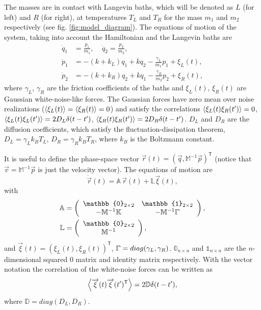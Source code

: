 The  masses are in contact with Langevin baths, which will be denoted as $L$ (for left) and $R$ (for right), at temperatures $T_{L}$ and $T_R$ for  the mass $m_1$ and $m_2$ respectively (see fig. \ref{fig:model_diagram}). The equations of motion of the system, taking into account the Hamiltonian and the Langevin baths are
%
\begin{align}
  \dot{q}_1 &= \frac{p_1}{m_1},\;\;\;\;
  \dot{q}_2 = \frac{p_2}{m_2},\nonumber
  \\
  \dot{p}_1 &= -(k+k_L)q_1 + k q_2 -\frac{\gamma_L}{m_1} p_1 + \xi_L(t),\nonumber
  \\
  \dot{p}_2 &= -(k+k_R)q_2 + k q_1 -\frac{\gamma_R}{m_2} p_2 + \xi_R(t),
\end{align}
%
where $\gamma_L$, $\gamma_R$ are the friction coefficients of the baths and $\xi_L(t)$, $\xi_R(t)$ are Gaussian white-noise-like forces. The Gaussian forces have zero mean over noise realizations ($\expval{ \xi_L(t) } = \expval{ \xi_R(t) } = 0 $) and satisfy the correlations $\expval{ \xi_L(t)\xi_R(t') } = 0$, $\expval{ \xi_L(t)\xi_L(t') } = 2D_L\delta(t-t')$, $\expval{ \xi_R(t)\xi_R(t') } = 2D_R\delta(t-t')$. $D_L$ and $D_R$ are the diffusion coefficients, which satisfy the fluctuation-dissipation theorem, $D_L = \gamma_L k_B T_L$, $D_R =\gamma_R k_B T_R$, where  $k_B$ is the Boltzmann constant.

It is useful to define the phase-space vector $\overrightarrow{r}(t) = \left( \overrightarrow{q}, \mathbb{M}^{-1}\overrightarrow{p} \right)^\mathsf{T}$ (notice that $\overrightarrow{v} = \mathbb{M}^{-1}\overrightarrow{p}$ is just the velocity vector).  The equations of motion are
%
\begin{equation}
  \dot{\overrightarrow{r}}(t) = \mathbb{A} \, \overrightarrow{r}(t) + \mathbb{L}\overrightarrow{\xi}(t),
  \label{eq:chapter6_vectorEqOfMotion}
\end{equation}
%
with
%
\begin{align}
  \mathbb{A} &=
  \left(
  \begin{array}{cc}
    \mathbb{0}_{2 \times 2} & \mathbb{1}_{2 \times 2}
    \\
    -\mathbb{M}^{-1}\mathbb{K} & -\mathbb{M}^{-1}\bbGamma
  \end{array}
  \right),
  \nonumber
  \\
  \mathbb{L} &=
  \left(
  \begin{array}{c}
    \mathbb{0}_{2\times 2} \\ \mathbb{M}^{-1}
  \end{array}
  \right),
  \label{eq:chapter6_Dynamical_Matrix}
\end{align}
%
and $\overrightarrow{\xi}(t) = \left( \xi_L(t),\xi_R(t) \right)^\mathsf{T}$, $\bbGamma = diag(\gamma_L,\gamma_R)$. $\mathbb{0}_{n\times n}$ and $\mathbb{1}_{n\times n}$ are the $n$-dimensional squared 0 matrix and identity matrix respectively. With the vector notation the correlation of the white-noise forces can be written as
%
\begin{equation}
  \expval{\overrightarrow{\xi}(t)\overrightarrow{\xi}(t')^\mathsf{T}} = 2 \mathbb{D}\delta(t-t'),
\end{equation}
%
where $\mathbb{D} = diag(D_L,D_R)$.
%
%
%
%
%
%
